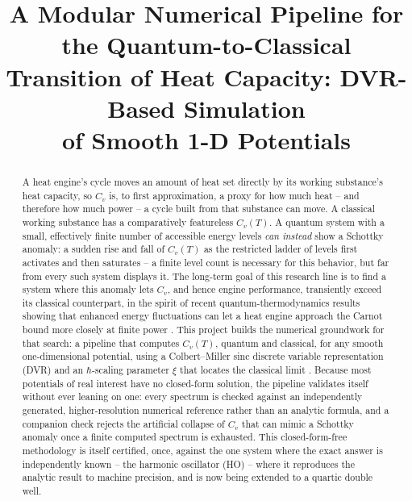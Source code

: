 \documentclass[10pt,conference]{IEEEtran}
\begin{document}
\title{A Modular Numerical Pipeline for the Quantum-to-Classical\\
Transition of Heat Capacity: DVR-Based Simulation\\
of Smooth 1-D Potentials}

\author{
}

\maketitle

\begin{abstract}
A heat engine's cycle moves an amount of heat set directly by its working substance's heat capacity, so $C_v$ is, to first approximation, a proxy for how much heat -- and therefore how much power -- a cycle built from that substance can move. A classical working substance has a comparatively featureless $C_v(T)$. A quantum system with a small, effectively finite number of accessible energy levels \emph{can instead} show a Schottky anomaly: a sudden rise and fall of $C_v(T)$ as the restricted ladder of levels first activates and then saturates \cite{gelbwaser2018,kozin2025} -- a finite level count is necessary for this behavior, but far from every such system displays it. The long-term goal of this research line is to find a system where this anomaly lets $C_v$, and hence engine performance, transiently exceed its classical counterpart, in the spirit of recent quantum-thermodynamics results showing that enhanced energy fluctuations can let a heat engine approach the Carnot bound more closely at finite power \cite{campisifazio2016,ye2017}. This project builds the numerical groundwork for that search: a pipeline that computes $C_v(T)$, quantum and classical, for any smooth one-dimensional potential, using a Colbert--Miller sinc discrete variable representation (DVR) \cite{colbertmiller1992,lightcarrington2000} and an $\hbar$-scaling parameter $\xi$ that locates the classical limit \cite{gelbwaser2018}. Because most potentials of real interest have no closed-form solution, the pipeline validates itself without ever leaning on one: every spectrum is checked against an independently generated, higher-resolution numerical reference rather than an analytic formula, and a companion check rejects the artificial collapse of $C_v$ that can mimic a Schottky anomaly once a finite computed spectrum is exhausted. This closed-form-free methodology is itself certified, once, against the one system where the exact answer is independently known -- the harmonic oscillator (HO) -- where it reproduces the analytic result to machine precision, and is now being extended to a quartic double well.
\end{abstract}
\end{document}
